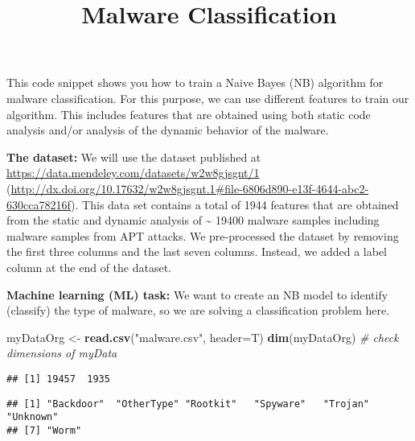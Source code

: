 \documentclass[]{article}
\title{Malware Classification}
\author{}
\date{}
\newenvironment{Shaded}{\begin{snugshade}}{\end{snugshade}}
\newcommand{\CommentTok}[1]{\textcolor[rgb]{0.56,0.35,0.01}{\textit{#1}}}
\newcommand{\DataTypeTok}[1]{\textcolor[rgb]{0.13,0.29,0.53}{#1}}
\newcommand{\KeywordTok}[1]{\textcolor[rgb]{0.13,0.29,0.53}{\textbf{#1}}}
\newcommand{\NormalTok}[1]{#1}
\newcommand{\OperatorTok}[1]{\textcolor[rgb]{0.81,0.36,0.00}{\textbf{#1}}}
\newcommand{\StringTok}[1]{\textcolor[rgb]{0.31,0.60,0.02}{#1}}
\begin{document}
\maketitle

This code snippet shows you how to train a Naive Bayes (NB) algorithm
for malware classification. For this purpose, we can use different
features to train our algorithm. This includes features that are
obtained using both static code analysis and/or analysis of the dynamic
behavior of the malware.

\textbf{The dataset:} We will use the dataset published at
\url{https://data.mendeley.com/datasets/w2w8gjsgnt/1}
(\url{http://dx.doi.org/10.17632/w2w8gjsgnt.1\#file-6806d890-e13f-4644-abc2-630cca78216f}).
This data set contains a total of 1944 features that are obtained from
the static and dynamic analysis of \textasciitilde{} 19400 malware
samples including malware samples from APT attacks. We pre-processed the
dataset by removing the first three columns and the last seven columns.
Instead, we added a label column at the end of the dataset.

\textbf{Machine learning (ML) task:} We want to create an NB model to
identify (classify) the type of malware, so we are solving a
classification problem here.

\begin{Shaded}
\begin{Highlighting}[]
\NormalTok{myDataOrg <-}\StringTok{ }\KeywordTok{read.csv}\NormalTok{(}\StringTok{"malware.csv"}\NormalTok{, }\DataTypeTok{header=}\NormalTok{T)}
\KeywordTok{dim}\NormalTok{(myDataOrg) }\CommentTok{# check dimensions of myData}
\end{Highlighting}
\end{Shaded}

\begin{verbatim}
## [1] 19457  1935
\end{verbatim}

\begin{Shaded}
\end{Shaded}

\begin{verbatim}
## [1] "Backdoor"  "OtherType" "Rootkit"   "Spyware"   "Trojan"    "Unknown"  
## [7] "Worm"
\end{verbatim}
\end{document}
